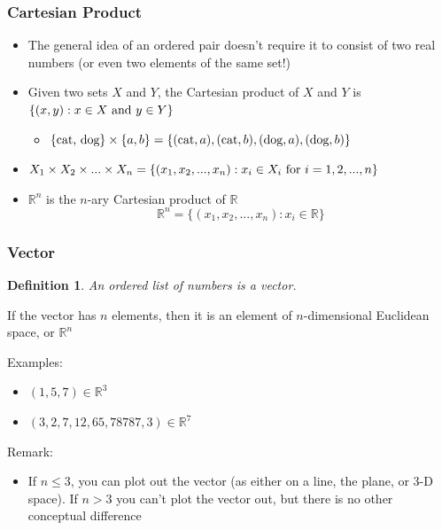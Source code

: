 \documentclass{beamer}
\newtheorem{defn}{Definition}
\numberwithin{equation}{section}
\begin{document}
\begin{frame}
\frametitle{Cartesian Product}

\begin{itemize}
\item The general idea of an ordered pair doesn't require it to consist of two real numbers (or even two elements  of the same set!)

\item Given two sets $X$ and $Y$, the Cartesian product of $X$ and $Y$ is $\{(x, y): x\in X \hbox{ and }y\in Y\}$

\begin{itemize}
\item $\{\hbox{cat, dog}\}\times \{a, b\}= \{(\hbox{cat}, a), (\hbox{cat}, b), (\hbox{dog}, a), (\hbox{dog}, b)\}$ \pause
\end{itemize}
\end{itemize}

\begin{itemize}
\item $X_1\times X_2\times ... \times X_n=\{(x_1, x_2, ..., x_n):x_i\in X_i \hbox{ for }i=1, 2, ..., n\}$ \pause
\end{itemize}

\begin{itemize}
\item $\mathbb{R}^n$ is the $n$-ary Cartesian product of $\mathbb{R}$
$$\mathbb{R}^n=\{(x_1, x_2, ..., x_n): x_i\in \mathbb{R} \}$$
\end{itemize}

\end{frame}



\begin{frame}
\frametitle{Vector}

\begin{defn}
An ordered list of numbers is a \textit{vector}.
\end{defn}
\pause

If the vector has $n$ elements, then it is an element of $n$-dimensional Euclidean space, or $\mathbb{R}^n$ \pause

{Examples: }
\begin{itemize}
\item $(1, 5, 7)\in \mathbb{R}^3$
\item $(3, 2, 7, 12, 65, 78787, 3)\in \mathbb{R}^7$ \pause
\end{itemize}

{Remark: }
\begin{itemize}
\item If $n\leq 3$, you can plot out the vector (as either on a line, the plane, or 3-D space). If $n>3$ you can't plot the vector out, but there is no other conceptual difference
\end{itemize}

\end{frame}
\end{document}
